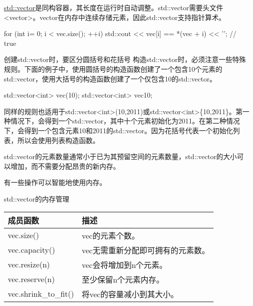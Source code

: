 

\href{http://en.cppreference.com/w/cpp/container/vector}{std::vector}是同构容器，其长度在运行时自动调整。std::vector需要头文件<vector>。vector在内存中连续存储元素，因此std::vector支持指针算术。

\begin{cpp}
for (int i= 0; i < vec.size(); ++i){
	std::cout << vec[i] == *(vec + i) << '\n'; // true
}
\end{cpp}

\begin{myTip}{创建std::vector时，要区分圆括号和花括号}
构造std::vector时，必须注意一些特殊规则。下面的例子中，使用圆括号的构造函数创建了一个包含10个元素的std::vector，使用大括号的构造函数创建了一个仅包含10的std::vector。

\begin{cpp}
std::vector<int> vec(10);
std::vector<int> vec{10};
\end{cpp}

同样的规则也适用于std::vector<int>(10,2011)或std::vector<int>\{10,2011\}。第一种情况下，会得到一个std::vector，其中十个元素初始化为2011。在第二种情况下，会得到一个包含元素10和2011的std::vector。因为花括号代表一个初始化列表，所以会使用列表构造函数。
\end{myTip}


std::vector的元素数量通常小于已为其预留空间的元素数量，std::vector的大小可以增加，而不需要分配昂贵的新内存。

有一些操作可以智能地使用内存。

\begin{center}
std::vector的内存管理
\end{center}

\begin{longtable}[c]{|l|l|}
\hline
\textbf{成员函数} & \textbf{描述}                                       \\ \hline
\endfirsthead
%
\endhead
%
vec.size()                & vec的元素个数。                                 \\ \hline
vec.capacity()            & vec无需重新分配即可拥有的元素数。 \\ \hline
vec.resize(n)             & vec会将增加到n个元素。                       \\ \hline
vec.reserve(n)            & 至少保留n个元素内存。                    \\ \hline
vec.shrink\_to\_fit()     & 将vec的容量减小到其大小。                       \\ \hline
\end{longtable}


